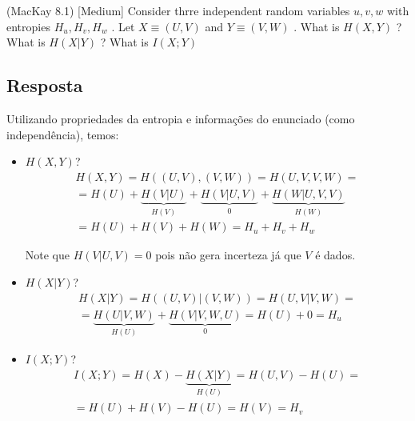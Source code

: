 (MacKay 8.1) [Medium]
Consider thrre independent random variables $u,v,w$ with entropies ${{H}_{u}},{{H}_{v}},{{H}_{w}}$ . Let $X\equiv (U,V)$  and $Y\equiv (V,W)$ . What is $H(X,Y)$ ? What is $H(X|Y)$ ? What is $I(X;Y)$ 

\subsection*{Resposta}

Utilizando propriedades da entropia e informações do enunciado (como independência), temos:

\begin{itemize}
    \item $H(X,Y)$?
    \[\begin{array}{l}
H\left( {X,Y} \right) = H\left( {(U,V),(V,W)} \right) = H\left( {U,V,V,W} \right) = \\
 = H(U) + \underbrace {H(V|U)}_{H(V)} + \underbrace {H(V|U,V)}_0 + \underbrace {H(W|U,V,V)}_{H(W)}\\
 = H(U) + H(V) + H(W) = {H_u} + {H_v} + {H_w}
\end{array}\]

Note que $H(V|U,V) = 0$ pois não gera incerteza já que $V$ é dados.

\item $H(X|Y)$?
\[\begin{array}{l}
H(X|Y) = H\left( {(U,V)|(V,W)} \right) = H\left( {U,V|V,W} \right) = \\
 = \underbrace {H(U|V,W)}_{H(U)} + \underbrace {H(V|V,W,U)}_0 = H(U) + 0 = {H_u}
\end{array}\]

\item $I(X;Y)$?
\[\begin{array}{l}
I(X;Y) = H(X) - \underbrace {H(X|Y)}_{H(U)} = H(U,V) - H(U) = \\
 = H(U) + H(V) - H(U) = H(V) = {H_v}
\end{array}\]

\end{itemize}

